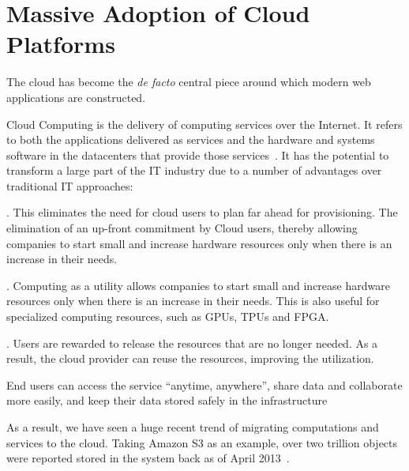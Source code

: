 \section{Massive Adoption of Cloud Platforms}
\label{sec:cloud}

The cloud has become the \textit{de facto} central piece around which
modern web applications are constructed.

Cloud Computing is the delivery of computing services over the Internet. It
refers to both the applications delivered as services and the hardware and
systems software in the datacenters that provide those
services~\cite{armbrust2010view}. It has the potential to transform a large part
of the IT industry due to a number of advantages over traditional IT approaches:


. This
eliminates the need for cloud users to plan far ahead for provisioning. The
elimination of an up-front commitment by Cloud users, thereby allowing companies
to start small and increase hardware resources only when there is an increase in
their needs.

. Computing as a utility allows companies to start small and
increase hardware resources only when there is an increase in their needs. This
is also useful for specialized computing resources, such as GPUs, TPUs and FPGA.

.  Users are
rewarded to release the resources that are no longer needed. As a result, the
cloud provider can reuse the resources, improving the utilization.

 End users can access
the service ``anytime, anywhere'', share data and collaborate more easily, and
keep their data stored safely in the infrastructure

As a result, we have seen a huge recent trend of migrating computations and
services to the cloud.  Taking Amazon S3 as an example, over two trillion
objects were reported stored in the system back as of April
2013~\cite{barr2013amazon}.

